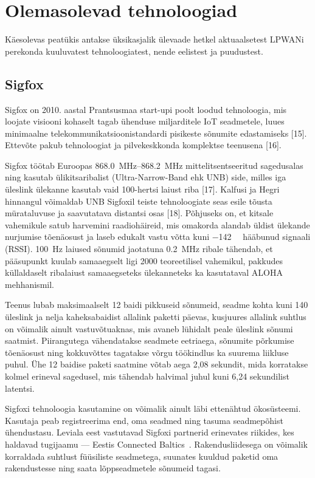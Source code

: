 \documentclass[12pt]{article}
\begin{document}
\newpage
\section{Olemasolevad tehnoloogiad}

Käesolevas peatükis antakse üksikasjalik ülevaade hetkel aktuaalsetest LPWANi perekonda kuuluvatest tehnoloogiatest, nende eelistest ja puudustest.

\subsection{Sigfox}

Sigfox on 2010. aastal Prantsusmaa start-upi poolt loodud tehnoloogia, mis loojate visiooni kohaselt tagab ühenduse miljarditele IoT seadmetele, luues minimaalne telekommunikatsioonistandardi pisikeste sõnumite edastamiseks [15].
Ettevõte pakub tehnoloogiat ja pilvekeskkonda komplektse teenusena [16].

Sigfox töötab Euroopas \SIrange{868.0}{868.2}{\mega\hertz} mittelitsentseeritud sagedusalas ning kasutab ülikitsaribalist (Ultra-Narrow-Band ehk UNB) side, milles iga üleslink ülekanne kasutab vaid 100-hertsi laiust riba [17].
Kalfusi ja Hegri hinnangul võimaldab UNB Sigfoxil teiste tehnoloogiate seas esile tõusta mürataluvuse ja saavutatava distantsi osas [18].
Põhjuseks on, et kitsale vahemikule satub harvemini raadiohäireid, mis omakorda alandab üldist ülekande nurjumise tõenäosust ja laseb edukalt vastu võtta kuni \SI{-142}{\deci\belm} hääbunud signaali (RSSI).
\SI{100}{\hertz} laiused sõnumid jaotatuna \SI{0,2}{\mega\hertz} ribale tähendab, et pääsupunkt kuulab samaaegselt ligi 2000 teoreetilisel vahemikul, pakkudes küllaldaselt ribalaiust samaaegseteks ülekanneteks ka kasutataval ALOHA mehhanismil.

Teenus lubab maksimaalselt 12 baidi pikkuseid sõnumeid, seadme kohta kuni 140 üleslink ja nelja kaheksabaidist allalink paketti päevas, kusjuures allalink suhtlus on võimalik ainult vastuvõtuaknas, mis avaneb lühidalt peale üleslink sõnumi saatmist.
Piirangutega vähendatakse seadmete eetriaega, sõnumite põrkumise tõenäosust ning kokkuvõttes tagatakse võrgu töökindlus ka suurema liikluse puhul.
Ühe 12 baidise paketi saatmine võtab aega 2,08 sekundit, mida korratakse kolmel erineval sagedusel, mis tähendab halvimal juhul kuni 6,24 sekundilist latentsi.

Sigfoxi tehnoloogia kasutamine on võimalik ainult läbi ettenähtud ökosüsteemi.
Kasutaja peab registreerima end, oma seadmed ning tasuma seadmepõhist ühendustasu.
Leviala eest vastutavad Sigfoxi partnerid erinevates riikides, kes haldavad tugijaamu — Eestis Connected Baltics~\cite{sfCoverage}.
Rakendusliidesega on võimalik korraldada suhtlust füüsiliste seadmetega, suunates kuuldud paketid oma rakendustesse ning saata lõppseadmetele sõnumeid tagasi.
\end{document}
